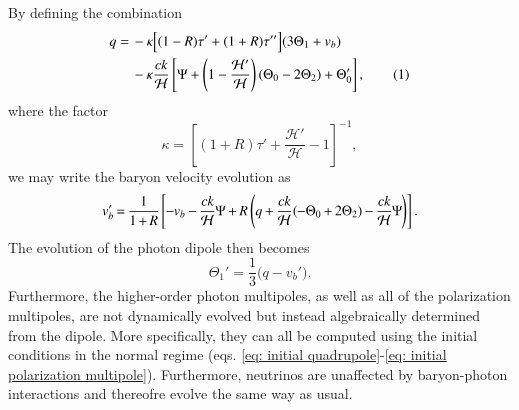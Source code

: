 \documentclass{aa}
\newcommand\numberthis{\addtocounter{equation}{1}\tag{\theequation}}
\numberwithin{equation}{section}
\numberwithin{table}{section}
\numberwithin{figure}{section}
\begin{document}
By defining the combination
\begin{align*}
q =\, &-\kappa\Big[(1 - R)\tau' + (1 + R)\tau''\Big](3\Theta_1 + v_b) \\
&-\kappa\frac{ck}{\mathcal{H}}\left[\Psi + \left(1 - \frac{\mathcal{H}'}{\mathcal{H}}\right)(\Theta_0 - 2\Theta_2) + \Theta_0'\right], \numberthis
\end{align*}
where the factor
\begin{equation}
  \kappa = \left[(1+R)\tau' + \frac{\mathcal{H'}}{\mathcal{H}}-1\right]^{-1},
\end{equation}
we may write the baryon velocity evolution as
\begin{equation}
v_b' \hspace{-1pt}=\hspace{-1pt} \frac{1}{1 \hspace{-0.7pt}+\hspace{-0.7pt} R} \hspace{-0.5pt}\left[ \hspace{-0.5pt}-\hspace{-0.5pt}v_b \hspace{-0.5pt}- \hspace{-0.5pt}\frac{ck}{\mathcal{H}} \hspace{-0.5pt}\Psi \hspace{-0.5pt}+\hspace{-0.5pt} R \left( q \hspace{-0.5pt}+ \hspace{-0.5pt}\frac{ck}{\mathcal{H}}(\hspace{-0.5pt}-\Theta_0 \hspace{-0.5pt}+\hspace{-0.5pt} 2\Theta_2) \hspace{-0.5pt}-\hspace{-0.5pt} \frac{ck}{\mathcal{H}}\hspace{-0.5pt} \Psi \hspace{-0.5pt}\right) \right].
\end{equation}
The evolution of the photon dipole then becomes
\begin{equation}
\Theta_1' = \frac{1}{3} \big(q - v_b'\big).
\end{equation}
Furthermore, the higher-order photon multipoles, as well as all of the polarization multipoles, are not dynamically evolved but instead algebraically determined from the dipole. More specifically, they can all be computed using the initial conditions in the normal regime (eqs. \eqref{eq: initial quadrupole}-\eqref{eq: initial polarization multipole}). Furthermore, neutrinos are unaffected by baryon-photon interactions and thereofre evolve the same way as usual. 
\end{document}
